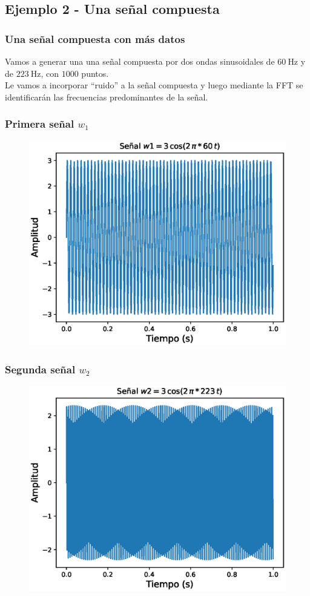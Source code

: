 \documentclass[12pt]{beamer}
\begin{document}
\subsection{Ejemplo 2 - Una señal compuesta}
\begin{frame}
\frametitle{Una señal compuesta con más datos}
Vamos a generar una una señal compuesta por dos ondas sinusoidales de $\SI{60}{\hertz}$ y de $\SI{223}{\hertz}$, con $1000$ puntos.
\\
\bigskip
\pause
Le vamos a incorporar \enquote{ruido} a la señal compuesta y luego mediante la FFT se identificarán las frecuencias predominantes de la señal.
\end{frame}
\begin{frame}
\frametitle{Primera señal $w_{1}$}
\begin{figure}
    \centering
    \includegraphics[scale=0.6]{Imagenes/DFT_Analisis_Senal_01.eps}
\end{figure}
\end{frame}
\begin{frame}
\frametitle{Segunda señal $w_{2}$}
\begin{figure}
    \centering
    \includegraphics[scale=0.6]{Imagenes/DFT_Analisis_Senal_02.eps}
\end{figure}
\end{frame}
\end{document}

